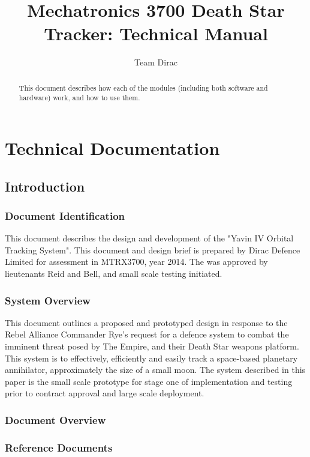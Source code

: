 \documentclass[10pt,a4paper]{report}
\author{Team Dirac}
\title{Mechatronics 3700 Death Star Tracker: Technical Manual}
\begin{document}
\maketitle

\begin{abstract}
	This document describes how each of the modules (including both software and hardware) work, and how to use them.
\end{abstract}

\part{Technical Documentation}
\chapter{Introduction}
\section{Document Identification}
This document describes the design and development of the "Yavin IV Orbital Tracking System".  This document and design brief is prepared by Dirac Defence Limited for assessment in MTRX3700, year 2014. The was approved by lieutenants Reid and Bell, and small scale testing initiated. 

\section{System Overview}
This document outlines a proposed and prototyped design in response to the Rebel Alliance Commander Rye's request for a defence system to combat the imminent threat posed by The Empire, and their Death Star weapons platform. This system is to effectively, efficiently and easily track a space-based planetary annihilator, approximately the size of a small moon.\newline
The system described in this paper is the small scale prototype for stage one of implementation and testing prior to contract approval and large scale deployment.

\section{Document Overview}

\section{Reference Documents}
\end{document}
